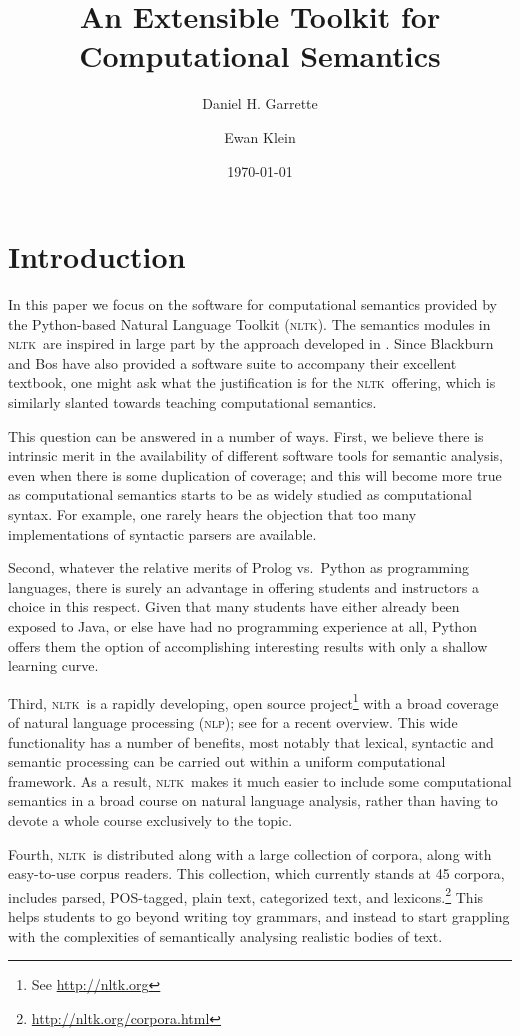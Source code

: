 \documentclass[11pt, a4paper]{article}
\newcommand{\NLP}{\textsc{nlp}}
\newcommand{\NLTK}{\textsc{nltk}}
\begin{document}
\title{An Extensible Toolkit for Computational Semantics}
\author{Daniel H. Garrette \and Ewan Klein}
\date{\today}
\maketitle

\section{Introduction}

In this paper we focus on the software for computational semantics provided
by the Python-based Natural Language Toolkit (\NLTK). The semantics
modules in \NLTK\ are
inspired in large part by the approach developed in \citet{BB}.
Since Blackburn and Bos have also provided a software suite to
accompany their excellent textbook, one might ask what the
justification is for the \NLTK\ offering, which is similarly slanted
towards teaching computational semantics.

This question can be answered in a number of ways. First, we believe
there is intrinsic merit in the availability of different software
tools for semantic analysis, even when there is some duplication of
coverage; and this will become more true as computational semantics
starts to be as widely studied as computational syntax. For example, one rarely
hears the objection that too many implementations of syntactic
parsers are available.

Second, whatever the relative merits of Prolog vs.\ Python as
programming languages, there is surely an advantage in offering
students and instructors a choice in this respect. Given that many
students have either already been exposed to Java, or else have had no
programming experience at all, Python offers them the option of
accomplishing interesting results with only a shallow
learning curve.

Third, \NLTK\ is a rapidly developing, open source
project\footnote{See \url{http://nltk.org}} with a broad coverage of
natural language processing (\NLP); see \citet{Multidisciplinary} for
a recent overview. This wide functionality has a number of benefits,
most notably that lexical, syntactic and semantic processing can be
carried out within a uniform computational framework. As a result,
\NLTK\ makes it much easier to include some computational semantics in
a broad course on natural language analysis, rather than having to
devote a whole course exclusively to the topic.

Fourth, \NLTK\ is distributed along with a large collection of
corpora, along with easy-to-use corpus readers.  This collection,
which currently stands at 45 corpora, includes parsed, POS-tagged,
plain text, categorized text, and
lexicons.\footnote{\url{http://nltk.org/corpora.html}} This helps
students to go beyond writing toy grammars, and instead to start 
grappling with the complexities of semantically analysing realistic
bodies of text.
\end{document}
